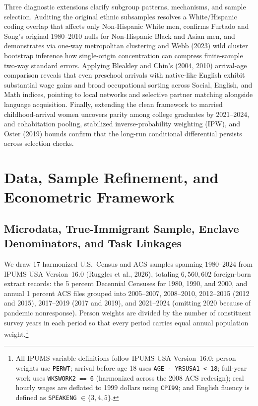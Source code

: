 \documentclass[11pt]{article}
\begin{document}
Three diagnostic extensions clarify subgroup patterns, mechanisms, and sample selection. Auditing the original ethnic subsamples resolves a White/Hispanic coding overlap that affects only Non-Hispanic White men, confirms Furtado and Song's original 1980--2010 nulls for Non-Hispanic Black and Asian men, and demonstrates via one-way metropolitan clustering and Webb (2023) wild cluster bootstrap inference how single-origin concentration can compress finite-sample two-way standard errors. Applying Bleakley and Chin's (2004, 2010) arrival-age comparison reveals that even preschool arrivals with native-like English exhibit substantial wage gains and broad occupational sorting across Social, English, and Math indices, pointing to local networks and selective partner matching alongside language acquisition. Finally, extending the clean framework to married childhood-arrival women uncovers parity among college graduates by 2021--2024, and cohabitation pooling, stabilized inverse-probability weighting (IPW), and Oster (2019) bounds confirm that the long-run conditional differential persists across selection checks.

\section{Data, Sample Refinement, and Econometric Framework}

\subsection{Microdata, True-Immigrant Sample, Enclave Denominators, and Task Linkages}
We draw 17 harmonized U.S.\ Census and ACS samples spanning 1980--2024 from IPUMS USA Version~16.0 (Ruggles et al., 2026), totaling $6{,}560{,}602$ foreign-born extract records: the 5 percent Decennial Censuses for 1980, 1990, and 2000, and annual 1 percent ACS files grouped into 2005--2007, 2008--2010, 2012--2015 (2012 and 2015), 2017--2019 (2017 and 2019), and 2021--2024 (omitting 2020 because of pandemic nonresponse). Person weights are divided by the number of constituent survey years in each period so that every period carries equal annual population weight.\footnote{All IPUMS variable definitions follow IPUMS USA Version~16.0: person weights use \texttt{PERWT}; arrival before age 18 uses \texttt{AGE - YRSUSA1 < 18}; full-year work uses \texttt{WKSWORK2 == 6} (harmonized across the 2008 ACS redesign); real hourly wages are deflated to 1999 dollars using \texttt{CPI99}; and English fluency is defined as \texttt{SPEAKENG} $\in \{3,4,5\}$.}
\end{document}
